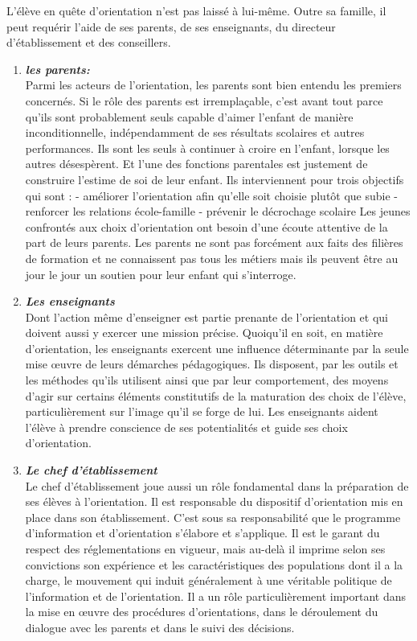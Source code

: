 L’élève en quête d’orientation n’est pas laissé à lui-même.  Outre sa famille, il peut requérir l’aide de ses parents, de ses enseignants, du directeur d’établissement et des conseillers.
\begin{enumerate}
	\item \textit{\textbf{les parents: }} \\
	Parmi les acteurs de l’orientation, les parents sont bien entendu les premiers concernés. Si le rôle des parents est irremplaçable, c’est  avant tout parce qu’ils sont probablement seuls capable d’aimer l’enfant de manière inconditionnelle, indépendamment de ses résultats scolaires et autres performances. Ils sont les seuls à continuer à croire en l’enfant, lorsque les autres désespèrent. Et l’une des fonctions parentales est justement de construire l’estime de soi de leur enfant.
Ils interviennent pour trois objectifs qui sont :	
-  améliorer l’orientation afin qu’elle soit choisie plutôt que subie
-  renforcer les relations école-famille 
-  prévenir le décrochage scolaire
Les jeunes confrontés aux choix d’orientation ont besoin  d’une écoute attentive de la part de leurs parents. Les parents  ne sont pas forcément aux faits des filières de formation et  ne connaissent pas tous les métiers mais ils peuvent être au  jour le jour un soutien pour leur enfant qui s’interroge.
		\item \textit{\textbf{Les enseignants}} \\
		Dont l’action même d’enseigner est partie prenante de l’orientation et qui doivent aussi y exercer une mission précise.
Quoiqu’il en soit, en matière d’orientation, les enseignants exercent une influence déterminante par la seule mise œuvre de leurs démarches pédagogiques. Ils disposent, par les outils et les méthodes qu’ils utilisent ainsi que par leur comportement, des moyens d’agir sur certains éléments constitutifs de la maturation des choix de l’élève, particulièrement sur l’image qu’il se forge de lui. Les enseignants aident l’élève à prendre conscience  de ses potentialités et guide ses choix d’orientation.  
	\item \textit{\textbf{Le chef d’établissement}} \\
	Le chef d’établissement joue aussi un rôle fondamental dans la préparation de ses élèves à l’orientation. Il est responsable du dispositif d’orientation mis en place dans son établissement. C’est sous sa responsabilité que le programme d’information et d’orientation s’élabore et s’applique. Il est le garant du respect des réglementations en vigueur, mais au-delà il imprime selon ses convictions son expérience et les caractéristiques des populations dont il a la charge, le mouvement qui induit généralement à une véritable politique de l’information et de l’orientation. Il a un rôle particulièrement important dans la mise en œuvre des procédures d’orientations, dans le déroulement du dialogue avec les parents et dans le suivi des décisions.

\end{enumerate}
